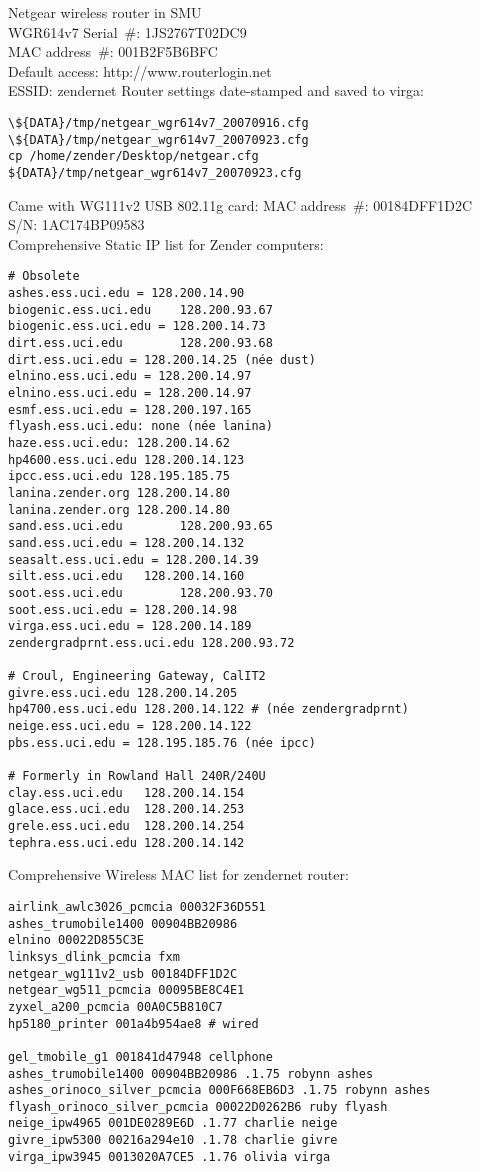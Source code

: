 \documentclass[12pt,twoside]{article}
\begin{document}
Netgear wireless router in SMU\\
WGR614v7
Serial~\#: 1JS2767T02DC9 \\
MAC address~\#: 001B2F5B6BFC \\
Default access: http://www.routerlogin.net \\
ESSID: zendernet
Router settings date-stamped and saved to virga: 
\begin{verbatim}
\${DATA}/tmp/netgear_wgr614v7_20070916.cfg
\${DATA}/tmp/netgear_wgr614v7_20070923.cfg
cp /home/zender/Desktop/netgear.cfg ${DATA}/tmp/netgear_wgr614v7_20070923.cfg
\end{verbatim}
Came with WG111v2 USB 802.11g card:
MAC address~\#: 00184DFF1D2C \\
S/N: 1AC174BP09583 \\

Comprehensive Static IP list for Zender computers:
\begin{verbatim}
# Obsolete
ashes.ess.uci.edu = 128.200.14.90
biogenic.ess.uci.edu    128.200.93.67
biogenic.ess.uci.edu = 128.200.14.73
dirt.ess.uci.edu        128.200.93.68
dirt.ess.uci.edu = 128.200.14.25 (née dust)
elnino.ess.uci.edu = 128.200.14.97
elnino.ess.uci.edu = 128.200.14.97
esmf.ess.uci.edu = 128.200.197.165
flyash.ess.uci.edu: none (née lanina)
haze.ess.uci.edu: 128.200.14.62
hp4600.ess.uci.edu 128.200.14.123
ipcc.ess.uci.edu 128.195.185.75
lanina.zender.org 128.200.14.80
lanina.zender.org 128.200.14.80
sand.ess.uci.edu        128.200.93.65
sand.ess.uci.edu = 128.200.14.132
seasalt.ess.uci.edu = 128.200.14.39
silt.ess.uci.edu   128.200.14.160
soot.ess.uci.edu        128.200.93.70
soot.ess.uci.edu = 128.200.14.98
virga.ess.uci.edu = 128.200.14.189
zendergradprnt.ess.uci.edu 128.200.93.72

# Croul, Engineering Gateway, CalIT2
givre.ess.uci.edu 128.200.14.205
hp4700.ess.uci.edu 128.200.14.122 # (née zendergradprnt)
neige.ess.uci.edu = 128.200.14.122
pbs.ess.uci.edu = 128.195.185.76 (née ipcc)

# Formerly in Rowland Hall 240R/240U
clay.ess.uci.edu   128.200.14.154
glace.ess.uci.edu  128.200.14.253
grele.ess.uci.edu  128.200.14.254
tephra.ess.uci.edu 128.200.14.142
\end{verbatim}

Comprehensive Wireless MAC list for zendernet router:
\begin{verbatim}
airlink_awlc3026_pcmcia 00032F36D551
ashes_trumobile1400 00904BB20986
elnino 00022D855C3E
linksys_dlink_pcmcia fxm
netgear_wg111v2_usb 00184DFF1D2C
netgear_wg511_pcmcia 00095BE8C4E1
zyxel_a200_pcmcia 00A0C5B810C7
hp5180_printer 001a4b954ae8 # wired

gel_tmobile_g1 001841d47948 cellphone
ashes_trumobile1400 00904BB20986 .1.75 robynn ashes
ashes_orinoco_silver_pcmcia 000F668EB6D3 .1.75 robynn ashes
flyash_orinoco_silver_pcmcia 00022D0262B6 ruby flyash
neige_ipw4965 001DE0289E6D .1.77 charlie neige
givre_ipw5300 00216a294e10 .1.78 charlie givre
virga_ipw3945 0013020A7CE5 .1.76 olivia virga
\end{verbatim}
\end{document}
